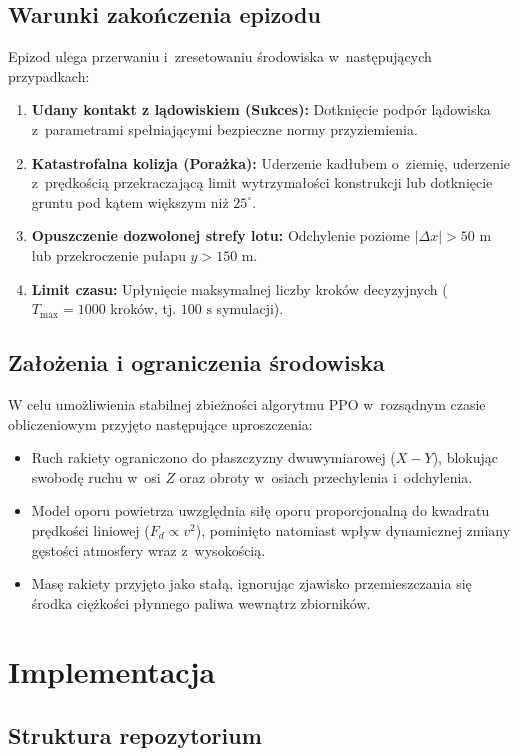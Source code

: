 \documentclass[12pt]{article}
\begin{document}
\subsection{Warunki zakończenia epizodu}
Epizod ulega przerwaniu i~zresetowaniu środowiska w~następujących przypadkach:
\begin{enumerate}
    \item \textbf{Udany kontakt z lądowiskiem (Sukces):} Dotknięcie podpór lądowiska z~parametrami spełniającymi bezpieczne normy przyziemienia.
    \item \textbf{Katastrofalna kolizja (Porażka):} Uderzenie kadłubem o~ziemię, uderzenie z~prędkością przekraczającą limit wytrzymałości konstrukcji lub dotknięcie gruntu pod kątem większym niż $25^\circ$.
    \item \textbf{Opuszczenie dozwolonej strefy lotu:} Odchylenie poziome $|\Delta x| > 50\text{ m}$ lub przekroczenie pułapu $y > 150\text{ m}$.
    \item \textbf{Limit czasu:} Upłynięcie maksymalnej liczby kroków decyzyjnych ($T_{\max} = 1000$ kroków, tj. $100\text{ s}$ symulacji).
\end{enumerate}

\subsection{Założenia i ograniczenia środowiska}

W celu umożliwienia stabilnej zbieżności algorytmu PPO w~rozsądnym czasie obliczeniowym przyjęto następujące uproszczenia:
\begin{itemize}
    \item Ruch rakiety ograniczono do płaszczyzny dwuwymiarowej ($X-Y$), blokując swobodę ruchu w~osi $Z$ oraz obroty w~osiach przechylenia i~odchylenia.
    \item Model oporu powietrza uwzględnia siłę oporu proporcjonalną do kwadratu prędkości liniowej ($F_d \propto v^2$), pominięto natomiast wpływ dynamicznej zmiany gęstości atmosfery wraz z~wysokością.
    \item Masę rakiety przyjęto jako stałą, ignorując zjawisko przemieszczania się środka ciężkości płynnego paliwa wewnątrz zbiorników.
\end{itemize}
\section{Implementacja}

\subsection{Struktura repozytorium}
\end{document}
